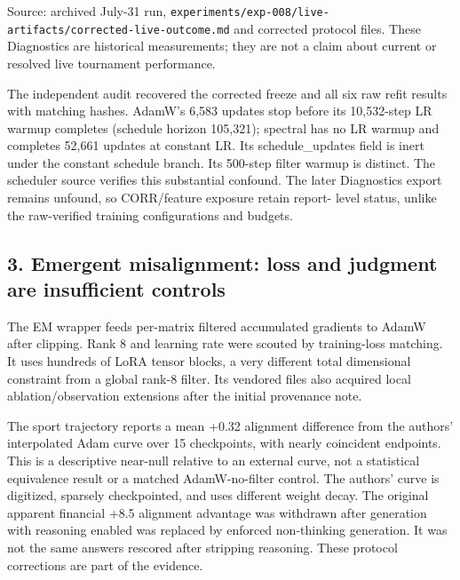 \documentclass[
  british,
  10pt,
  a4paper,
]{article}
\begin{document}
Source: archived July-31 run,
\texttt{experiments/\allowbreak{}exp-\allowbreak{}008/\allowbreak{}live-\allowbreak{}artifacts/\allowbreak{}corrected-\allowbreak{}live-\allowbreak{}outcome.\allowbreak{}md}
and corrected protocol files. These Diagnostics are historical
measurements; they are not a claim about current or resolved live
tournament performance.\allowbreak{}

The independent audit recovered the corrected freeze and all six raw
refit results with matching hashes. AdamW's 6,583 updates stop before
its 10,\allowbreak{}532-\allowbreak{}step LR warmup completes (schedule
horizon 105,321); spectral has no LR warmup and completes 52,661 updates
at constant LR. Its schedule\_updates field is inert under the constant
schedule branch. Its 500-step filter warmup is distinct. The scheduler
source verifies this substantial confound. The later Diagnostics export
remains unfound, so CORR/\allowbreak{}feature exposure retain report-
level status, unlike the raw-\allowbreak{}verified training
configurations and budgets.

\subsection{3. Emergent misalignment: loss and judgment are insufficient
controls}\label{external-studies--emergent-misalignment-loss-and-judgment-are-insufficient-controls}

The EM wrapper feeds per-matrix filtered accumulated gradients to AdamW
after clipping. Rank 8 and learning rate were scouted by
training-\allowbreak{}loss matching. It uses hundreds of LoRA tensor
blocks, a very different total dimensional constraint from a global
rank-8 filter. Its vendored files also acquired local
ablation/\allowbreak{}observation extensions after the initial
provenance note.

The sport trajectory reports a mean +0.32 alignment difference from the
authors' interpolated Adam curve over 15 checkpoints,\allowbreak{} with
nearly coincident endpoints. This is a descriptive near-null relative to
an external curve, not a statistical equivalence result or a matched
AdamW-\allowbreak{}no-\allowbreak{}filter control. The authors' curve is
digitized, sparsely checkpointed\allowbreak{},\allowbreak{} and uses
different weight decay. The original apparent financial +8.5 alignment
advantage was withdrawn after generation with reasoning enabled was
replaced by enforced non-\allowbreak{}thinking generation.\allowbreak{}
It was not the same answers rescored after stripping reasoning. These
protocol corrections are part of the evidence.
\end{document}
